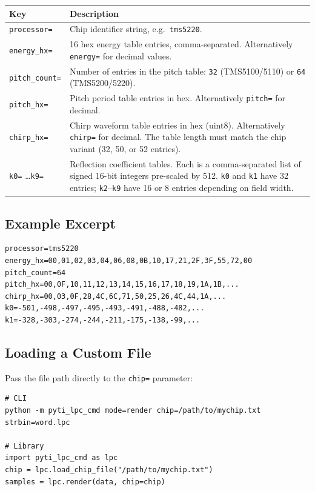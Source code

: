 \documentclass[10pt]{article}
\begin{document}
\begin{center}
\begin{tabular}{p{3.0cm}p{8.5cm}}
\toprule
Key & Description \\
\midrule
\texttt{processor=} & Chip identifier string, e.g.\ \texttt{tms5220}. \\
\texttt{energy\_hx=} & 16 hex energy table entries, comma-separated.
  Alternatively \texttt{energy=} for decimal values. \\
\texttt{pitch\_count=} & Number of entries in the pitch table: \texttt{32}
  (TMS5100/5110) or \texttt{64} (TMS5200/5220). \\
\texttt{pitch\_hx=} & Pitch period table entries in hex.
  Alternatively \texttt{pitch=} for decimal. \\
\texttt{chirp\_hx=} & Chirp waveform table entries in hex (uint8).
  Alternatively \texttt{chirp=} for decimal.
  The table length must match the chip variant (32, 50, or 52 entries). \\
\texttt{k0=} \ldots \texttt{k9=} & Reflection coefficient tables.
  Each is a comma-separated list of signed 16-bit integers pre-scaled
  by 512.  \texttt{k0} and \texttt{k1} have 32 entries; \texttt{k2}--\texttt{k9}
  have 16 or 8 entries depending on field width. \\
\bottomrule
\end{tabular}
\end{center}

\subsection{Example Excerpt}

\begin{lstlisting}[caption={Partial chip definition file (TMS5220)}]
processor=tms5220
energy_hx=00,01,02,03,04,06,08,0B,10,17,21,2F,3F,55,72,00
pitch_count=64
pitch_hx=00,0F,10,11,12,13,14,15,16,17,18,19,1A,1B,...
chirp_hx=00,03,0F,28,4C,6C,71,50,25,26,4C,44,1A,...
k0=-501,-498,-497,-495,-493,-491,-488,-482,...
k1=-328,-303,-274,-244,-211,-175,-138,-99,...
\end{lstlisting}

\subsection{Loading a Custom File}

Pass the file path directly to the \texttt{chip=} parameter:

\begin{lstlisting}[caption={Loading a custom chip definition}]
# CLI
python -m pyti_lpc_cmd mode=render chip=/path/to/mychip.txt strbin=word.lpc

# Library
import pyti_lpc_cmd as lpc
chip = lpc.load_chip_file("/path/to/mychip.txt")
samples = lpc.render(data, chip=chip)
\end{lstlisting}
\end{document}

